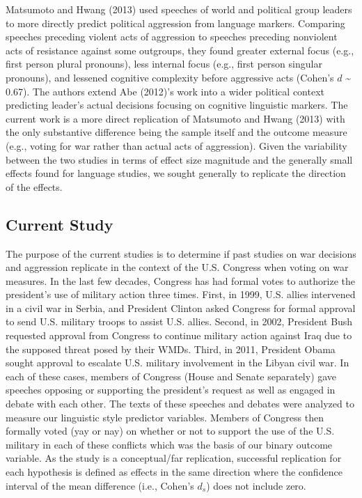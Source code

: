 \documentclass[
  english,
  ,man,floatsintext]{apa6}
\begin{document}
Matsumoto and Hwang (2013) used speeches of world and political group leaders to more directly predict political aggression from language markers. Comparing speeches preceding violent acts of aggression to speeches preceding nonviolent acts of resistance against some outgroups, they found greater external focus (e.g., first person plural pronouns), less internal focus (e.g., first person singular pronouns), and lessened cognitive complexity before aggressive acts (Cohen's \(d\) \textasciitilde{} 0.67). The authors extend Abe (2012)'s work into a wider political context predicting leader's actual decisions focusing on cognitive linguistic markers. The current work is a more direct replication of Matsumoto and Hwang (2013) with the only substantive difference being the sample itself and the outcome measure (e.g., voting for war rather than actual acts of aggression). Given the variability between the two studies in terms of effect size magnitude and the generally small effects found for language studies, we sought generally to replicate the direction of the effects.

\hypertarget{current-study}{%
\subsection{Current Study}\label{current-study}}

The purpose of the current studies is to determine if past studies on war decisions and aggression replicate in the context of the U.S. Congress when voting on war measures. In the last few decades, Congress has had formal votes to authorize the president's use of military action three times. First, in 1999, U.S. allies intervened in a civil war in Serbia, and President Clinton asked Congress for formal approval to send U.S. military troops to assist U.S. allies. Second, in 2002, President Bush requested approval from Congress to continue military action against Iraq due to the supposed threat posed by their WMDs. Third, in 2011, President Obama sought approval to escalate U.S. military involvement in the Libyan civil war. In each of these cases, members of Congress (House and Senate separately) gave speeches opposing or supporting the president's request as well as engaged in debate with each other. The texts of these speeches and debates were analyzed to measure our linguistic style predictor variables. Members of Congress then formally voted (yay or nay) on whether or not to support the use of the U.S. military in each of these conflicts which was the basis of our binary outcome variable. As the study is a conceptual/far replication, successful replication for each hypothesis is defined as effects in the same direction where the confidence interval of the mean difference (i.e., Cohen's \(d_s\)) does not include zero.
\end{document}
